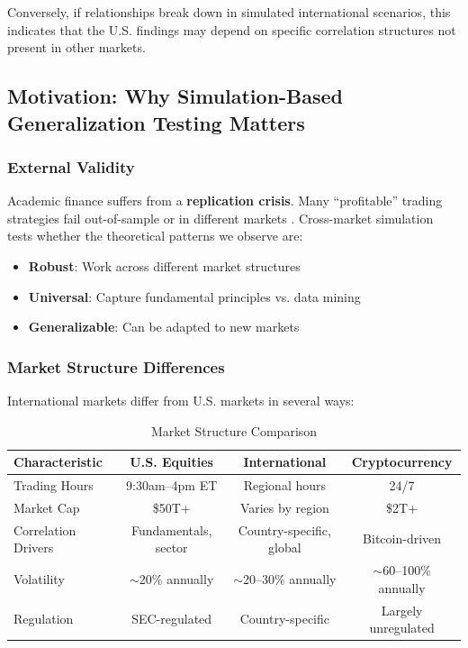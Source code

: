 Conversely, if relationships break down in simulated international scenarios, this indicates that the U.S. findings may depend on specific correlation structures not present in other markets.

\subsection{Motivation: Why Simulation-Based Generalization Testing Matters}

\subsubsection{External Validity}

Academic finance suffers from a \textbf{replication crisis}. Many ``profitable'' trading strategies fail out-of-sample or in different markets \citep{Harvey2016}. Cross-market simulation tests whether the theoretical patterns we observe are:

\begin{itemize}
\item \textbf{Robust}: Work across different market structures
\item \textbf{Universal}: Capture fundamental principles vs. data mining
\item \textbf{Generalizable}: Can be adapted to new markets
\end{itemize}

\subsubsection{Market Structure Differences}

International markets differ from U.S. markets in several ways:

\begin{table}[H]
\centering
\caption{Market Structure Comparison}
\label{tab:market-structure}
\begin{tabular}{@{}lccc@{}}
\toprule
\textbf{Characteristic} & \textbf{U.S. Equities} & \textbf{International} & \textbf{Cryptocurrency} \\
\midrule
Trading Hours & 9:30am--4pm ET & Regional hours & 24/7 \\
Market Cap & \$50T+ & Varies by region & \$2T+ \\
Correlation Drivers & Fundamentals, sector & Country-specific, global & Bitcoin-driven \\
Volatility & $\sim$20\% annually & $\sim$20--30\% annually & $\sim$60--100\% annually \\
Regulation & SEC-regulated & Country-specific & Largely unregulated \\
\bottomrule
\end{tabular}
\end{table}

